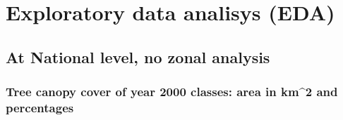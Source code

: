 \documentclass[10pt,landscape,a3paper]{article}
\begin{document}
\hypertarget{exploratory-data-analisys-eda}{%
\section{Exploratory data analisys
(EDA)}\label{exploratory-data-analisys-eda}}

\hypertarget{at-national-level-no-zonal-analysis}{%
\subsection{At National level, no zonal
analysis}\label{at-national-level-no-zonal-analysis}}

\hypertarget{tree-canopy-cover-of-year-2000-classes-area-in-km2-and-percentages}{%
\subsubsection{Tree canopy cover of year 2000 classes: area in km\^{}2
and
percentages}\label{tree-canopy-cover-of-year-2000-classes-area-in-km2-and-percentages}}
\end{document}
